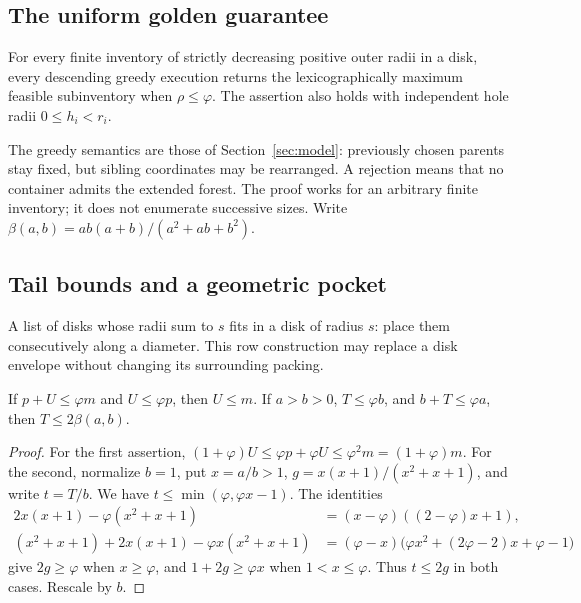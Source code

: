 \subsection{The uniform golden guarantee}\label{sec:goldenglobal}
\begin{theorem}\label{thm:golden-global}\label{conj:golden}
For every finite inventory of strictly decreasing positive outer radii
in a disk, every descending greedy execution returns the lexicographically
maximum feasible subinventory when $\rho\le\varphi$. The assertion
also holds with independent hole radii $0\le h_i<r_i$.
\end{theorem}
The greedy semantics are those of Section~\ref{sec:model}: previously
chosen parents stay fixed, but sibling coordinates may be rearranged.
A rejection means that no container admits the extended forest.
The proof works for an arbitrary finite inventory; it does not enumerate
successive sizes. Write $\beta(a,b)=ab(a+b)/(a^2+ab+b^2)$.

\subsection{Tail bounds and a geometric pocket}

A list of disks whose radii sum to $s$ fits in a disk of radius $s$:
place them consecutively along a diameter. This row construction may
replace a disk envelope without changing its surrounding packing.

\begin{lemma}\label{gt:tails}
If $p+U\le\varphi m$ and $U\le\varphi p$, then $U\le m$.
If $a>b>0$, $T\le\varphi b$, and $b+T\le\varphi a$, then
$T\le2\beta(a,b)$.
\end{lemma}
\begin{proof}
For the first assertion,
$(1+\varphi)U\le\varphi p+\varphi U\le\varphi^2m=(1+\varphi)m$.
For the second, normalize $b=1$, put $x=a/b>1$,
$g=x(x+1)/(x^2+x+1)$, and write $t=T/b$. We have
$t\le\min(\varphi,\varphi x-1)$. The identities
\begin{align*}
 2x(x+1)-\varphi(x^2+x+1)
   &=(x-\varphi)((2-\varphi)x+1),\\
 (x^2+x+1)+2x(x+1)-\varphi x(x^2+x+1)
   &=(\varphi-x)\bigl(\varphi x^2+(2\varphi-2)x+\varphi-1\bigr)
\end{align*}
give $2g\ge\varphi$ when $x\ge\varphi$, and
$1+2g\ge\varphi x$ when $1<x\le\varphi$. Thus $t\le2g$ in
both cases. Rescale by $b$.
\end{proof}

